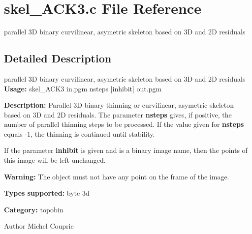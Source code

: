 \section{skel\_\-ACK3.c File Reference}
\label{skel__ACK3_8c}


parallel 3D binary curvilinear, asymetric skeleton based on 3D and 2D residuals  




\subsection{Detailed Description}
parallel 3D binary curvilinear, asymetric skeleton based on 3D and 2D residuals {\bfseries Usage:} skel\_\-ACK3 in.pgm nsteps [inhibit] out.pgm

{\bfseries Description:} Parallel 3D binary thinning or curvilinear, asymetric skeleton based on 3D and 2D residuals. The parameter {\bfseries nsteps} gives, if positive, the number of parallel thinning steps to be processed. If the value given for {\bfseries nsteps} equals -\/1, the thinning is continued until stability.

If the parameter {\bfseries inhibit} is given and is a binary image name, then the points of this image will be left unchanged.

{\bfseries Warning:} The object must not have any point on the frame of the image.

{\bfseries Types supported:} byte 3d

{\bfseries Category:} topobin

\begin{DoxyAuthor}{Author}
Michel Couprie 
\end{DoxyAuthor}
